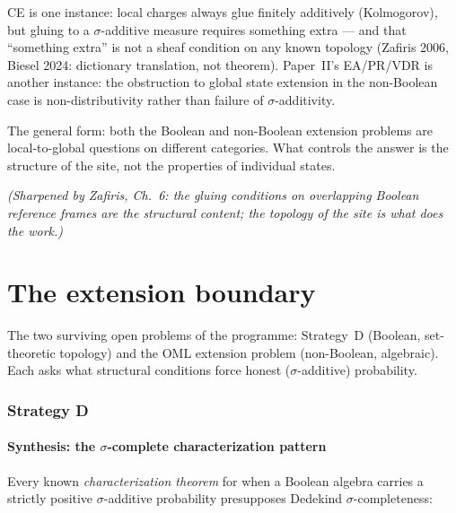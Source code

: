 \begin{enumerate}
    \smallskip\noindent
    CE is one instance: local charges always glue finitely
    additively (Kolmogorov), but gluing to a $\sigma$-additive
    measure requires something extra --- and that ``something
    extra'' is not a sheaf condition on any known topology
    (Zafiris 2006, Biesel 2024: dictionary translation, not
    theorem).  Paper~II's EA/PR/VDR is another instance: the
    obstruction to global state extension in the non-Boolean case
    is non-distributivity rather than failure of $\sigma$-additivity.

    \smallskip\noindent
    The general form: both the Boolean and non-Boolean extension
    problems are local-to-global questions on different categories.
    What controls the answer is the structure of the site, not the
    properties of individual states.

    \smallskip\noindent
    \emph{(Sharpened by Zafiris, Ch.~6: the gluing conditions
    on overlapping Boolean reference frames are the structural
    content; the topology of the site is what does the work.)}
\end{enumerate}


\part{The extension boundary}

The two surviving open problems of the programme: Strategy~D
(Boolean, set-theoretic topology) and the OML extension problem
(non-Boolean, algebraic).  Each asks what structural conditions
force honest ($\sigma$-additive) probability.

\section{Strategy D}

\subsection*{Synthesis: the $\sigma$-complete characterization pattern}

Every known \emph{characterization theorem} for when a Boolean algebra
carries a strictly positive $\sigma$-additive probability presupposes
Dedekind $\sigma$-completeness:

